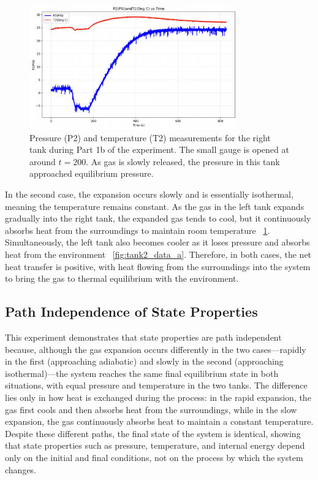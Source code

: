 \documentclass[12pt]{article}
\begin{document}
\begin{figure}[h!]
\centering
\includegraphics[width=0.8\textwidth]{1b-right_tank.png}
\caption{Pressure (P2) and temperature (T2) measurements for the right tank during Part 1b of the experiment. The small gauge is opened at around $t=200$. As gas is slowly released, the pressure in this tank approached equilibrium pressure.}
\label{fig:tank2_data_b}
\end{figure}

In the second case, the expansion occurs slowly and is essentially isothermal, meaning the temperature remains constant. As the gas in the left tank expands gradually into the right tank, the expanded gas tends to cool, but it continuously absorbs heat from the surroundings to maintain room temperature ~\ref{fig:tank2_data_b}. Simultaneously, the left tank also becomes cooler as it loses pressure and absorbs heat from the environment ~\ref{fig:tank2_data_a}. Therefore, in both cases, the net heat transfer is positive, with heat flowing from the surroundings into the system to bring the gas to thermal equilibrium with the environment.

\subsection*{Path Independence of State Properties}
This experiment demonstrates that state properties are path independent because, although the gas expansion occurs differently in the two cases—rapidly in the first (approaching adiabatic) and slowly in the second (approaching isothermal)—the system reaches the same final equilibrium state in both situations, with equal pressure and temperature in the two tanks. The difference lies only in how heat is exchanged during the process: in the rapid expansion, the gas first cools and then absorbs heat from the surroundings, while in the slow expansion, the gas continuously absorbs heat to maintain a constant temperature. Despite these different paths, the final state of the system is identical, showing that state properties such as pressure, temperature, and internal energy depend only on the initial and final conditions, not on the process by which the system changes.
\end{document}

